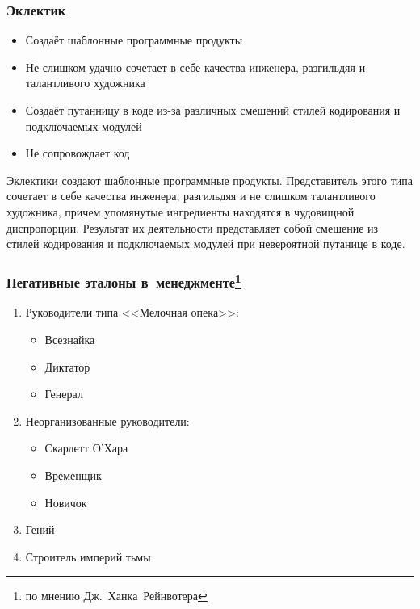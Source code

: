 \documentclass{../industrial-development}
\begin{document}
{\begin{frame} \frametitle{Эклектик}
	\begin{itemize}
		\item Создаёт шаблонные программные продукты
		\item Не слишком удачно сочетает в себе качества инженера, разгильдяя и  талантливого художника 
		\item Создаёт путанницу в коде из-за различных смешений стилей кодирования и подключаемых модулей
		\item Не сопровождает код
	\end{itemize}
\end{frame}
\lecturenotes
Эклектики создают шаблонные программные продукты. Представитель этого типа сочетает в себе качества инженера, разгильдяя и не слишком талантливого художника, причем упомянутые ингредиенты находятся в чудовищной диспропорции. Результат их деятельности представляет собой смешение из стилей кодирования и подключаемых модулей при невероятной путанице в коде. 

\begin{frame} \frametitle{Негативные эталоны в~менеджменте\footnote[1]{по мнению Дж.~Ханка~Рейнвотера}}
	\begin{enumerate}
\item Руководители типа <<Мелочная опека>>:
		 \begin{itemize}
                     \item Всезнайка
 		 \item Диктатор
 		 \item Генерал
		\end{itemize} 
\item Неорганизованные руководители:	
		 \begin{itemize}
                     \item Скарлетт О'Хара
		 \item Временщик
 		\item Новичок
		\end{itemize} 
\item Гений
\item Строитель империй тьмы
\end{enumerate}
\end{frame}
\lecturenotes


}
\end{document}
